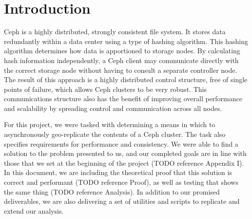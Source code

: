 \chapter{Introduction}
\label{sec:introduction}

Ceph is a highly distributed, strongly consistent file system. It
stores data redundantly within a data center using a type of hashing
algorithm. This hashing algorithm determines how data is apportioned
to storage nodes.  By calculating hash information independently, a
Ceph client may communicate directly with the correct storage node
without having to consult a separate controller node. The result of
this approach is a highly distributed control structure, free of
single points of failure, which allows Ceph clusters to be very
robust. This communications structure also has the benefit of
improving overall performance and scalability by spreading control and
communication across all nodes.

For this project, we were tasked with determining a means in which to
asynchronously geo-replicate the contents of a Ceph cluster. The task
also specifies requirements for performance and consistency. We were
able to find a solution to the problem presented to us, and our
completed goals are in line with those that we set at the beginning of
the project (TODO reference Appendix I). In this document, we are
including the theoretical proof that this solution is correct and
performant (TODO reference Proof), as well as testing that shows the
same thing (TODO reference Analysis). In addition to our promised
deliverables, we are also delivering a set of utilities and scripts to
replicate and extend our analysis.
